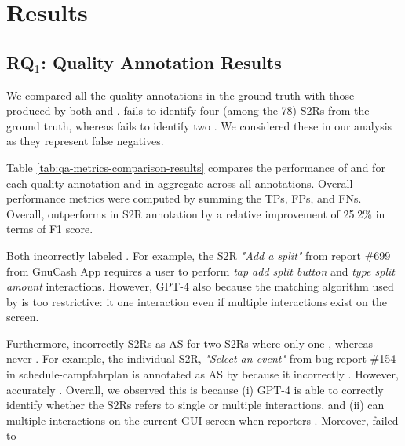 
\section{Results}
\label{sec:results}
\subsection{RQ$_1$: Quality Annotation Results}
	We compared all the quality annotations in the ground truth with those produced by both \tool and \EulerC.   
	\EulerC fails to identify four (among the 78) S2Rs from the ground truth, whereas \tool fails to identify two . We considered these in our analysis as they represent false negatives.
	
	Table \ref{tab:qa-metrics-comparison-results} compares the performance of \tool and \EulerC for each quality annotation and in aggregate across all annotations. Overall performance metrics were computed by summing the TPs, FPs, and FNs. Overall, \tool outperforms \EulerC in S2R annotation by a relative improvement of 25.2\% in terms of F1 score. 
	
	

	Both  incorrectly labeled . For example, the S2R \textit{"Add a split"} from report \#699 from GnuCash App \cite{gnucash699} requires a user to perform \textit{tap add split button} and \textit{type split amount} interactions. However, GPT-4 
	\EulerC also  because the matching algorithm used by \EulerC is too restrictive: it  one interaction even if multiple interactions exist on the screen. 
	
	Furthermore, \EulerC incorrectly  S2Rs as AS for two S2Rs where only one , whereas \tool never . For example, the individual S2R, \textit{"Select an event"} from bug report \#154 in schedule-campfahrplan \cite{schedule154} is annotated as AS by \EulerC because it incorrectly . However, \tool accurately . Overall, we observed this is because (i) GPT-4 is able to correctly identify whether the S2Rs refers to single or multiple interactions, and (ii) \tool can  multiple interactions on the current GUI screen when reporters . Moreover, \EulerC failed to 
	
